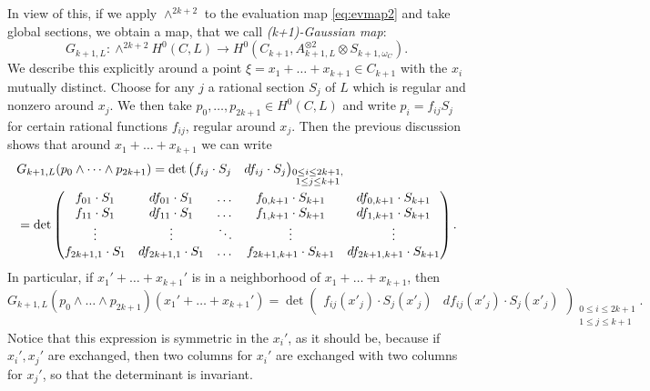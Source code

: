 \documentclass[12pt]{amsart}
\numberwithin{equation}{section}
\numberwithin{thmcounter}{section}
\theoremstyle{definition}
\theoremstyle{claim}
\begin{document}
In view of this, if we apply $\wedge^{2k+2}$ to the evaluation map \eqref{eq:evmap2} and take global sections, we obtain a map, that we call \emph{(k+1)-Gaussian map}:
\begin{equation}\label{eq:k+1gaussianmap}
G_{k+1,L}\colon \wedge^{2k+2} H^0(C,L) \longrightarrow H^0(C_{k+1},A_{k+1,L}^{\otimes 2}\otimes S_{k+1,\omega_C}).
 \end{equation}
 We describe this explicitly around a point $\xi=x_1+\dots+x_{k+1} \in C_{k+1}$ with the $x_i$ mutually distinct.  Choose for any $j$ a rational section $S_j$ of $L$ which is regular and nonzero around  $x_j$. We then take $p_0,\dots,p_{2k+1}\in H^0(C,L)$ and write $p_i = f_{ij} S_j$ for certain rational functions $f_{ij}$, regular around $x_j$. Then the previous discussion shows that around $x_1+\dots+x_{k+1}$ we can write
\begin{align}
&G_{k+1,L}(p_0\wedge \dots \wedge p_{2k+1}) = \det \begin{pmatrix} f_{ij}\cdot S_j & df_{ij}\cdot S_j \end{pmatrix}_{\substack{0\leq i\leq 2k+1,\\ 1\leq j \leq k+1} }
\notag \\
& = \det
\begin{pmatrix}
f_{01}\cdot S_1 & df_{01}\cdot S_1 & \dots & f_{0,k+1}\cdot S_{k+1} & df_{0,k+1}\cdot S_{k+1}\\
f_{11}\cdot S_1 & df_{11}\cdot S_1 & \dots & f_{1,k+1}\cdot S_{k+1} & df_{1,k+1}\cdot S_{k+1}\\
\vdots & \vdots & \ddots & \vdots & \vdots \\
f_{2k+1,1}\cdot S_1 & df_{2k+1,1}\cdot S_1 & \dots & f_{2k+1,k+1}\cdot S_{k+1} & df_{2k+1,k+1}\cdot S_{k+1} \label{eq:highergaussian}
\end{pmatrix}.
\end{align}
In particular, if $x_1'+\dots+x_{k+1}'$ is in a neighborhood of $x_1+\dots+x_{k+1}$, then
\begin{equation*}
	G_{k+1,L}(p_0\wedge \dots \wedge p_{2k+1})(x_1'+\dots+x_{k+1}') = \det \begin{pmatrix} f_{ij}(x'_j)\cdot S_j(x'_j) & df_{ij}(x'_j)\cdot S_j(x'_j) \end{pmatrix}_{\substack{0\leq i\leq 2k+1 \\ 1\leq j \leq k+1 }}.
\end{equation*}
Notice that this expression is symmetric in the $x_i'$, as it should be, because if $x_i',x_j'$ are exchanged, then two columns for $x_i'$ are  exchanged with two columns for $x_j'$, so that the determinant is invariant.
\end{document}

